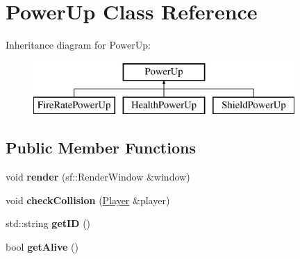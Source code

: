 \hypertarget{class_power_up}{}\section{Power\+Up Class Reference}
\label{class_power_up}
Inheritance diagram for Power\+Up\+:\begin{figure}[H]
\begin{center}
\leavevmode
\includegraphics[height=2.000000cm]{class_power_up}
\end{center}
\end{figure}
\subsection*{Public Member Functions}
\begin{DoxyCompactItemize}
\item 
\mbox{\label{class_power_up_aedf1753416959783efb44085b4234354}} 
void {\bfseries render} (sf\+::\+Render\+Window \&window)
\item 
\mbox{\label{class_power_up_aa47b799ef32511e4bb9c7291221759c9}} 
void {\bfseries check\+Collision} (\mbox{\hyperlink{class_player}{Player}} \&player)
\item 
\mbox{\label{class_power_up_aa41037987ffd11a180652c895717cf8d}} 
std\+::string {\bfseries get\+ID} ()
\item 
\mbox{\label{class_power_up_a588f763447a32832f39885855d3b5f09}} 
bool {\bfseries get\+Alive} ()
\end{DoxyCompactItemize}
